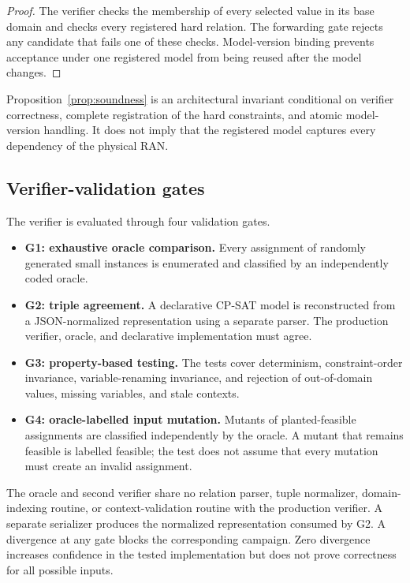 \documentclass[pdflatex,sn-mathphys-num,iicol,oneside]{sn-jnl}
\newcommand{\cpsat}{\textsc{CP-SAT}\xspace}
\begin{document}
\begin{proof}
The verifier checks the membership of every selected value in its base
domain and checks every registered hard relation. The forwarding gate
rejects any candidate that fails one of these checks. Model-version
binding prevents acceptance under one registered model from being
reused after the model changes.
\end{proof}

Proposition~\ref{prop:soundness} is an architectural invariant
conditional on verifier correctness, complete registration of the
hard constraints, and atomic model-version handling. It does not
imply that the registered model captures every dependency of the
physical RAN.

\subsection{Verifier-validation gates}

The verifier is evaluated through four validation gates.

\begin{itemize}

\item \textbf{G1: exhaustive oracle comparison.}
Every assignment of randomly generated small instances is enumerated
and classified by an independently coded oracle.

\item \textbf{G2: triple agreement.}
A declarative \cpsat model is reconstructed from a JSON-normalized
representation using a separate parser. The production verifier,
oracle, and declarative implementation must agree.

\item \textbf{G3: property-based testing.}
The tests cover determinism, constraint-order invariance,
variable-renaming invariance, and rejection of out-of-domain values,
missing variables, and stale contexts.

\item \textbf{G4: oracle-labelled input mutation.}
Mutants of planted-feasible assignments are classified independently
by the oracle. A mutant that remains feasible is labelled feasible;
the test does not assume that every mutation must create an invalid
assignment.

\end{itemize}

The oracle and second verifier share no relation parser, tuple
normalizer, domain-indexing routine, or context-validation routine
with the production verifier. A separate serializer produces the
normalized representation consumed by G2. A divergence at any gate
blocks the corresponding campaign. Zero divergence increases
confidence in the tested implementation but does not prove correctness
for all possible inputs.
\end{document}

